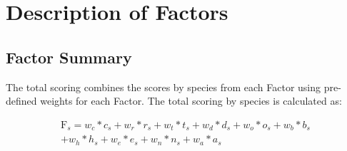 \documentclass[11pt,
  english,
  a4paper,
]{article}
\begin{document}
\leavevmode\tagmcend\tagstructend\par

\newpage


\hypertarget{description-of-factors}{%
\section{Description of Factors}\label{description-of-factors}}

\leavevmode\tagmcend\tagstructend


\hypertarget{factor-summary}{%
\subsection{Factor Summary}\label{factor-summary}}

\leavevmode\tagmcend\tagstructend


The total scoring combines the scores by species from each Factor using pre-defined weights for each Factor. The total scoring by species is calculated as:

\leavevmode\tagmcend\tagstructend\par


\begin{equation}
\begin{aligned}
    \text{F}_s = w_c*c_{s} + w_r*r_{s} + w_t*t_{s} + w_d*d_{s} + w_o*o_{s} + w_b*b_s \\
             + w_h*h_s + w_e*e_s + w_n*n_s + w_a*a_s
\end{aligned}
\end{equation}

\leavevmode\tagmcend\tagstructend\par

\end{document}
